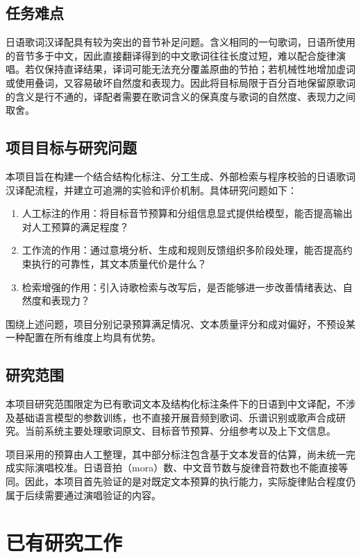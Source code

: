 \documentclass[12pt, a4paper]{ctexart}
\numberwithin{table}{section}
\numberwithin{figure}{section}
\begin{document}
\subsection{任务难点}
日语歌词汉译配具有较为突出的音节补足问题。含义相同的一句歌词，日语所使用的音节多于中文，因此直接翻译得到的中文歌词往往长度过短，难以配合旋律演唱。若仅保持直译结果，译词可能无法充分覆盖原曲的节拍；若机械性地增加虚词或使用叠词，又容易破坏自然度和表现力。因此将目标局限于百分百地保留原歌词的含义是行不通的，译配者需要在歌词含义的保真度与歌词的自然度、表现力之间取舍。

\subsection{项目目标与研究问题}
本项目旨在构建一个结合结构化标注、分工生成、外部检索与程序校验的日语歌词汉译配流程，并建立可追溯的实验和评价机制。具体研究问题如下：
\begin{enumerate}[leftmargin=2em]
  \item 人工标注的作用：将目标音节预算和分组信息显式提供给模型，能否提高输出对人工预算的满足程度？
  \item 工作流的作用：通过意境分析、生成和规则反馈组织多阶段处理，能否提高约束执行的可靠性，其文本质量代价是什么？
  \item 检索增强的作用：引入诗歌检索与改写后，是否能够进一步改善情绪表达、自然度和表现力？
\end{enumerate}
围绕上述问题，项目分别记录预算满足情况、文本质量评分和成对偏好，不预设某一种配置在所有维度上均具有优势。

\subsection{研究范围}
本项目研究范围限定为已有歌词文本及结构化标注条件下的日语到中文译配，不涉及基础语言模型的参数训练，也不直接开展音频到歌词、乐谱识别或歌声合成研究。当前系统主要处理歌词原文、目标音节预算、分组参考以及上下文信息。

项目采用的预算由人工整理，其中部分标注包含基于文本发音的估算，尚未统一完成实际演唱校准。日语音拍（mora）数、中文音节数与旋律音符数也不能直接等同。因此，本项目首先验证的是对既定文本预算的执行能力，实际旋律贴合程度仍属于后续需要通过演唱验证的内容。

\section{已有研究工作}
\end{document}
